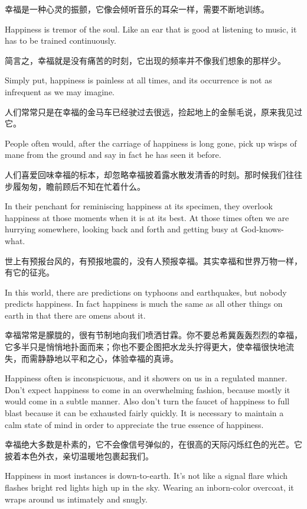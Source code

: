{幸福是一种心灵的振颤，它像会倾听音乐的耳朵一样，需要不断地训练。

Happiness is tremor of the soul. Like an ear that is good at listening to music, it has to be trained continuously.

简言之，幸福就是没有痛苦的时刻，它出现的频率并不像我们想象的那样少。

Simply put, happiness is painless at all times, and its occurrence is not as infrequent as we may imagine.

人们常常只是在幸福的金马车已经驶过去很远，捡起地上的金鬃毛说，原来我见过它。

People often would, after the carriage of happiness is long gone, pick up wisps of mane from the ground and say in fact he has seen it before.

人们喜爱回味幸福的标本，却忽略幸福披着露水散发清香的时刻。那时候我们往往步履匆匆，瞻前顾后不知在忙着什么。

In their penchant for reminiscing happiness at its specimen, they overlook happiness at those moments when it is at its best. At those times often we are hurrying somewhere, looking back and forth and getting busy at God-knows-what.

世上有预报台风的，有预报地震的，没有人预报幸福。其实幸福和世界万物一样，有它的征兆。

In this world, there are predictions on typhoons and earthquakes, but nobody predicts happiness. In fact happiness is much the same as all other things on earth in that there are omens about it.

幸福常常是朦胧的，很有节制地向我们喷洒甘霖。你不要总希冀轰轰烈烈的幸福，它多半只是悄悄地扑面而来；你也不要企图把水龙头拧得更大，使幸福很快地流失，而需静静地以平和之心，体验幸福的真谛。

Happiness often is inconspicuous, and it showers on us in a regulated manner. Don't expect happiness to come in an overwhelming fashion, because mostly it would come in a subtle manner. Also don't turn the faucet of happiness to full blast because it can be exhausted fairly quickly. It is necessary to maintain a calm state of mind in order to appreciate the true essence of happiness.

幸福绝大多数是朴素的，它不会像信号弹似的，在很高的天际闪烁红色的光芒。它披着本色外衣，亲切温暖地包裹起我们。

Happiness in most instances is down-to-earth. It's not like a signal flare which flashes bright red lights high up in the sky. Wearing an inborn-color overcoat, it wraps around us intimately and snugly.

}
